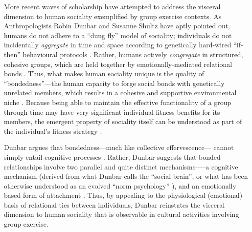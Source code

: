\begin{CJK}{UTF8}{gbsn}
More recent waves of scholarship have attempted to address the visceral dimension to human sociality exemplified by group exercise contexts.  As Anthropologists Robin Dunbar and Susanne Shultz have aptly pointed out, humans do not adhere to a ``dung fly'' model of sociality; individuals do not incidentally \textit{aggregate} in time and space according to genetically hard-wired ``if-then'' behavioural protocols \citep[cf.][]{Wilson1975}.  Rather, humans actively \textit{congregate} in structured, cohesive groups, which are held together by emotionally-mediated relational bonds \citep[777]{Dunbar2010}.  Thus, what makes human sociality unique is the quality of ``bondedness''---the human capacity to forge social bonds with genetically unrelated members, which results in a cohesive
and supportive environmental niche \citep[cf.][]{Odling-Smee2003}.
Because being able to maintain the effective functionality of a group through time may have very significant individual fitness benefits for its members, the emergent property of sociality itself can be understood as part of the individual’s fitness strategy \citep{Dunbar2010b,Nowak2010}.

Dunbar argues that bondedness---much like collective effervescence--- cannot simply entail cognitive processes \citep[at least not in the way cognitive processes are narrowly rendered by game-theoretic and gene-culture coevolutionary models][]{Dunbar2010}.  Rather, Dunbar suggests that bonded relationships involve two parallel and quite distinct mechanisms—--a cognitive mechanism (derived from what Dunbar calls the ``social brain''\citep{Dunbar1998}, or what has been otherwise understood as an evolved ``norm psychology'' \citep{Chudek2011}), and an emotionally based form of attachment \citep[often involving a psycho-pharmacological mechanism][]{Dunbar2010b}.  Thus, by appealing to the physiological (emotional) basis of relational ties between individuals, Dunbar reinstates the visceral dimension to human sociality that is observable in cultural activities involving group exercise.



\end{CJK}
